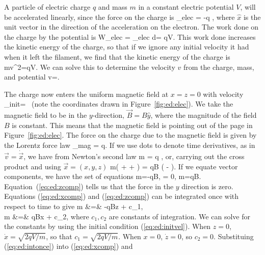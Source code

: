 A particle of electric charge $q$ and mass $m$ in a constant electric 
potential $V$, will be accelerated linearly, since the force on the charge is
\beq
{}_{\mbox{\tiny elec}} = -q  ,
\eeq
where $\hat{x}$ is the unit vector in the direction of the acceleration on the
electron. The work done on the charge by the potential is 
\beq
W_{\mbox{\tiny elec}} = \int {}_{\mbox{\tiny elec}} \cdot d= qV.
\eeq
This work done increases the kinetic energy of the charge, so that if we ignore
any initial velocity it had when it left the filament, we find that the 
kinetic energy of the charge is 
\beq
{} mv^2=qV. \label{eq:ed:kinetic}
\eeq 
We can solve this to determine the velocity $v$ from the charge, mass, and 
potential
\beq
v=. \label{eq:ed:velocity}
\eeq

The charge now enters the uniform magnetic field at $x=z=0$ with velocity
\beq
{}_{\mbox{\tiny init}}=~ \label{eq:ed:initvel}
\eeq 
(note the coordinates drawn in Figure~\ref{fig:ed:elec}). We take the 
magnetic field to be in the $y$-direction, $\vec{B}=B\hat{y}$, where the 
magnitude of the field $B$ is constant. This means that the magnetic field is 
pointing out of the page in Figure~\ref{fig:ed:elec}. The force on the charge 
due to the magnetic field is given by the Lorentz force law  
\beq
{}_{\mbox{\tiny mag}} = q\times{}. 
\eeq
If we use dots to denote time derivatives, as in $\vec{v} = \dot{\vec{x}}$, we 
have from Newton's second law
\beq
m  = q  \times {},
\eeq
or, carrying out the cross product and using $\vec{x}=(x,y,z)$
\beq
m\left( +  +  \right) 
= qB \left( - \right).
\eeq
If we equate vector components, we have the set of equations
\beq
m=-qB, \label{eq:ed:xcomp} 
\eeq
\beq
{} = 0, \label{eq:ed:ycomp} 
\eeq
\beq
m=qB. \label{eq:ed:zcomp} 
\eeq 
Equation~(\ref{eq:ed:zcomp}) tells us that the force in the $y$ direction is
zero. Equations (\ref{eq:ed:xcomp}) and (\ref{eq:ed:zcomp}) can be integrated
once with respect to time to give 
\beqra
m &=& -qBz + c_1, \nonumber \\
m &=& qBx + c_2, \label{eq:ed:intonce} 
\eeqra
where $c_1,c_2$ are constants of integration. We can solve for the constants by
using the initial condition (\ref{eq:ed:initvel}). When $z=0$, 
$\dot{x}=\sqrt{2qV/m}$, so that $c_1=\sqrt{2qV/m}$. When $x=0$, $\dot{z}=0$, so
$c_2=0$. Substituing (\ref{eq:ed:intonce}) into (\ref{eq:ed:xcomp}) and 
